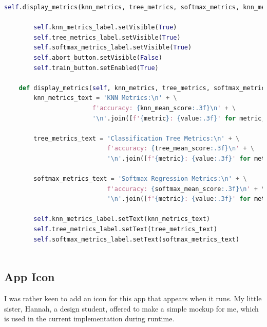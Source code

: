 \documentclass[letterpaper,10pt]{article}
\begin{document}
\begin{lstlisting}[language=Python, caption=ui.py - Final structure after refactoring. ]
        self.display_metrics(knn_metrics, tree_metrics, softmax_metrics, knn_mean_score, tree_mean_score, softmax_mean_score)
        
        self.knn_metrics_label.setVisible(True)
        self.tree_metrics_label.setVisible(True)
        self.softmax_metrics_label.setVisible(True)
        self.abort_button.setVisible(False)
        self.train_button.setEnabled(True)
    
    def display_metrics(self, knn_metrics, tree_metrics, softmax_metrics, knn_mean_score, tree_mean_score, softmax_mean_score):
        knn_metrics_text = 'KNN Metrics:\n' + \
                        f'accuracy: {knn_mean_score:.3f}\n' + \
                        '\n'.join([f'{metric}: {value:.3f}' for metric, value in knn_metrics.items()])
        
        tree_metrics_text = 'Classification Tree Metrics:\n' + \
                            f'accuracy: {tree_mean_score:.3f}\n' + \
                            '\n'.join([f'{metric}: {value:.3f}' for metric, value in tree_metrics.items()])
        
        softmax_metrics_text = 'Softmax Regression Metrics:\n' + \
                            f'accuracy: {softmax_mean_score:.3f}\n' + \
                            '\n'.join([f'{metric}: {value:.3f}' for metric, value in softmax_metrics.items()])
        
        self.knn_metrics_label.setText(knn_metrics_text)
        self.tree_metrics_label.setText(tree_metrics_text)
        self.softmax_metrics_label.setText(softmax_metrics_text)



\end{lstlisting}
\subsection{App Icon}

I was rather keen to add an icon for this app that appears when it runs. My little sister, Hannah, a design student, offered to make a simple mockup for me, which is used in the current implementation during runtime.
\end{document}
